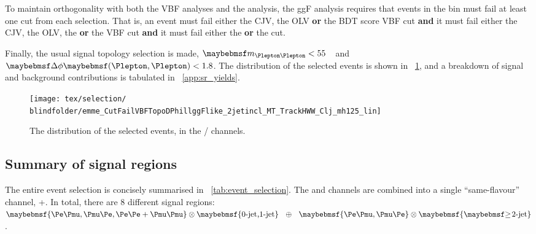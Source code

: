 To maintain orthogonality with both the VBF analyses and the \VH analysis, the ggF analysis 
requires that events in the \twojet bin must fail at least one cut from each selection. That 
is, an event must fail either the CJV, the OLV \textbf{or} the BDT score VBF cut 
\textbf{and} it must fail either the CJV, the OLV, the \mjj \textbf{or} the \dyjj VBF cut 
\textbf{and} it must fail either the \dyjj \textbf{or} the \mjj \VH cut.

Finally, the usual signal topology selection is made, \unit{$\mll < 55$}{\GeV} and 
$\dphill < 1.8$. 
The \mt distribution of the selected \twojet events is shown in \Figure~\ref{fig:sel:2j:mt}, 
and a breakdown of signal and background contributions is tabulated in 
\Appendix~\ref{app:sr_yields}.

\begin{figure}[t]
	\texttt{[image: tex/selection/\\blindfolder/emme\_CutFailVBFTopoDPhillggFlike\_2jetincl\_MT\_TrackHWW\_Clj\_mh125\_lin]}
	\caption{The \mt distribution of the selected \twojet events, in the \emch/\mech 
	channels.}
	\label{fig:sel:2j:mt}
\end{figure}



\subsection{Summary of signal regions}
\label{sec:selection:summary}

The entire event selection is concisely summarised in \Table~\ref{tab:event_selection}. The 
\eech and \mmch channels are combined into a single ``same-flavour'' channel, \eech{}+\mmch.
In total, there are 8 different signal regions: $\braces{\emch,\mech,\eech{}+\mmch} 
\otimes \braces{\text{0-jet,1-jet}}~~\oplus~~\braces{\emch,\mech} \otimes \braces{\twojet}$. 

